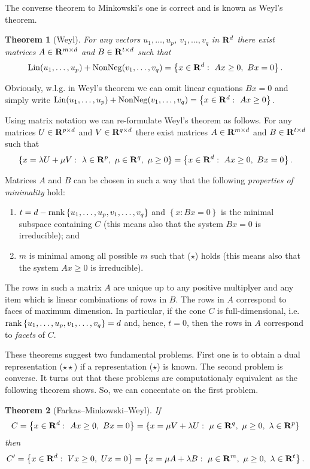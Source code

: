 \documentclass{article}
\newtheorem{theorem}{Theorem}
\newcommand{\RR}{{\rm\bf R}}
\newcommand{\Lin}{\mathop{\rm Lin}\nolimits}
\newcommand{\NonNeg}{\mathop{\rm NonNeg}\nolimits}
\newcommand{\rank}{\mathop{\rm rank}\nolimits}
\newcommand{\set}[1]{\left\{ #1\right\}}
\newcounter{formula}
\begin{document}
The converse theorem to Minkowski's one is correct and is known as Weyl's theorem.

\begin{theorem}[Weyl]
For any vectors
$u_1,\dots,u_p$, $v_1,\dots,v_q$ in $\RR^d$ there exist matrices
$A\in \RR^{m\times d}$ and $B\in \RR^{t\times d}$ such that
$$
\Lin(u_1,\dots,u_p) + \NonNeg(v_1,\dots,v_q) = \set{x\in\RR^d:~Ax\ge 0,~Bx= 0}.
$$
\end{theorem}

Obviously, w.l.g. in Weyl's theorem 
we can omit linear equations $Bx=0$ and 
simply write $\Lin(u_1,\dots,u_p) + \NonNeg(v_1,\dots,v_q) = \set{x\in\RR^d:~Ax\ge 0}$.

Using matrix notation we can re-formulate Weyl's theorem as follows.
For any matrices 
$U\in \RR^{p\times d}$ and $V\in \RR^{q\times d}$ 
there exist matrices $A \in \RR^{m\times d}$ and $B\in \RR^{t\times d}$ such that
$$                 
\set{x = \lambda U + \mu V:~ \lambda \in \RR^p,~ \mu \in \RR^q,~ \mu \ge 0} =
\set{x\in\RR^d:~Ax\ge 0,~Bx= 0}.
$$

Matrices $A$ and $B$ can be chosen in such a way that 
the following {\em properties of minimality} hold:
\begin{enumerate}
  \item $t = d - \rank \set{u_1,\dots,u_p, v_1,\dots,v_q}$
        and $\set{x: Bx = 0}$ is the minimal subspace containing $C$
        (this means also that the system $Bx = 0$ is irreducible); and
  \item $m$ is minimal among all possible $m$ such that ($\star$)
        holds (this means also that the system $Ax \ge 0$ is irreducible).
\end{enumerate}
The rows in such a matrix $A$ are unique up to any positive multiplyer and
any item which is linear combinations of rows in $B$. The rows in $A$
correspond to faces of maximum dimension. In particular, if the cone $C$ is
full-dimensional, i.e. $\rank \set{u_1,\dots,u_p, v_1,\dots,v_q} = d$ and,
hence, $t=0$, then the rows in $A$ correspond to {\em facets} of $C$.

These theorems suggest two fundamental problems. First one is to obtain a dual representation
($\star\star$) if a representation ($\star$) is known. The second problem is converse.
It turns out that these problems are computationaly equivalent as the following theorem shows.
So, we can concentate on the first problem.

\begin{theorem}[Farkas--Minkowski--Weyl]
If 
$$
C=\set{x\in\RR^d:~Ax\ge 0, ~ Bx = 0} = 
\set{x = \mu V + \lambda U :~ \mu \in \RR^q,~ \mu \ge 0,~ \lambda \in \RR^p}
$$
then
$$
C'=\set{x\in\RR^d:~Vx\ge 0, ~ Ux = 0} = 
\set{x = \mu A + \lambda B :~ \mu \in \RR^m,~ \mu \ge 0,~ \lambda \in \RR^t}.
$$
\end{theorem}
\end{document}
